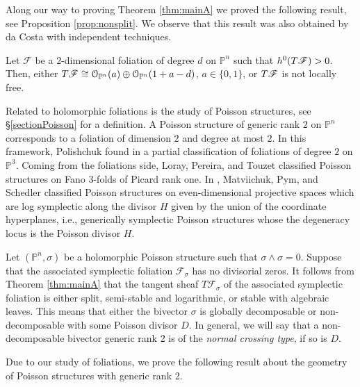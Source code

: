 \documentclass[twoside]{amsart}
\numberwithin{equation}{section}
\newcommand{\p}[1]{{\mathbb{P}^{#1}}}
\newcommand{\opn}{{\mathcal O}_{\mathbb{P}^{n}}}
\newcommand{\pn}{{\mathbb{P}^{n}}}
\newcommand{\sF}{\mathscr{F}}
\newcommand{\tF}{{\rm T}\sF}
\newenvironment{propintro}[1]
{\renewcommand\theinnerpropintro{#1}\innerpropintro}
{\endinnerpropintro}
\theoremstyle{definition}
\begin{document}
Along our way to proving Theorem \ref{thm:mainA} we proved the following result, see Proposition \ref{prop:nonsplit}. We observe that this result was also obtained by da Costa \cite{C} with independent techniques.

\begin{propintro}{B}\label{prop:B}
Let $\sF$ be a $2$-dimensional foliation of degree $d$ on $\pn$ such that $h^0(\tF)>0$. Then, either $\tF\cong \opn(a)\oplus \opn(1+a-d)$, $a\in\{0,1\}$, or $\tF$ is not locally free. 
\end{propintro}


Related to holomorphic foliations is the study of Poisson structures, see \S\ref{sectionPoisson} for a definition. A Poisson structure of generic rank $2$ on $\pn$ corresponds to a foliation of dimension $2$ and degree at most $2$. In this framework, Polishchuk found in \cite{Polishchuk} a partial classification of foliations of degree $2$ on $\p3$. Coming from the foliations side, Loray, Pereira, and Touzet \cite{LPT2} classified Poisson structures on Fano $3$-folds of Picard rank one. In \cite[section 5.3]{Matviichuk-Pym-Schedler}, Matviichuk, Pym, and Schedler classified Poisson structures on even-dimensional projective spaces which are log symplectic along the divisor $H$ given by the union of the coordinate hyperplanes, i.e., generically symplectic Poisson structures whose the degeneracy locus is the Poisson divisor $H$.

 

Let $(\pn, \sigma)$ be a holomorphic Poisson structure such that $\sigma \wedge \sigma =0$. 
Suppose that the associated symplectic foliation $\sF_\sigma$  has no divisorial zeros. It follows from Theorem \ref{thm:mainA} that the tangent sheaf $T\sF_\sigma$ of the associated symplectic foliation is either split, semi-stable and logarithmic, or stable with algebraic leaves. This means that either the bivector $\sigma$ is globally decomposable or non-decomposable with some  Poisson divisor $D$. 
In general, we will say that a non-decomposable bivector generic rank 2  is of the \textit{normal crossing type}, if so is $D$.








Due to our study of foliations, we prove the following result about the geometry of Poisson structures with generic rank 2. 
\end{document}
